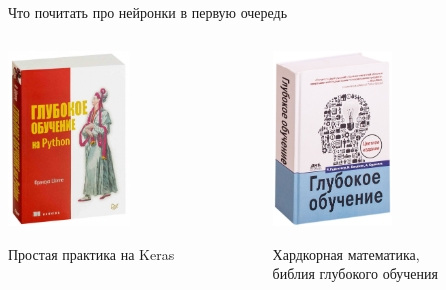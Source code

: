 \documentclass[notes,12pt, aspectratio=169]{beamer}
\begin{document}
\begin{frame}{Что почитать про нейронки в первую очередь}
\begin{columns}
	\begin{column}{0.5\textwidth}
		\begin{center}
			\includegraphics[width=0.5\textwidth]{book3.jpg}
			
	\footnotesize Простая практика на Keras
		\end{center}
	\end{column}
	\begin{column}{0.5\textwidth}
		\begin{center}
			\includegraphics[width=0.5\textwidth]{book4.jpg}
			
	\footnotesize Хардкорная математика, \\ библия глубокого обучения
		\end{center}
	\end{column}
\end{columns}
\end{frame} 
\end{document}
